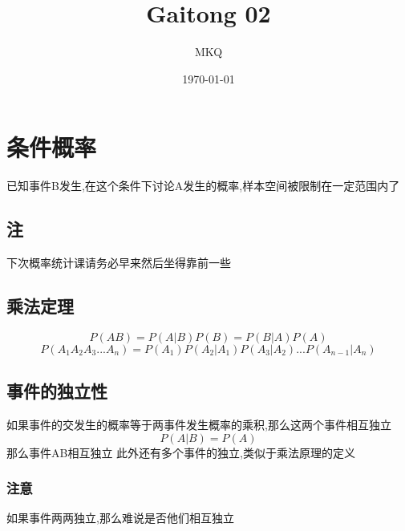 \documentclass[11pt]{article}
\author{MKQ}
\date{\today}
\title{Gaitong 02}
\begin{document}
\maketitle
\tableofcontents

\section{条件概率}
\label{sec:org6d7f063}
已知事件B发生,在这个条件下讨论A发生的概率,样本空间被限制在一定范围内了
\subsection{注}
\label{sec:org4fb7e56}
下次概率统计课请务必早来然后坐得靠前一些
\subsection{乘法定理}
\label{sec:orgee187d3}
\[
P(AB)=P(A|B)P(B)=P(B|A)P(A)
\]
\[
P(A_1 A_2 A_3 ... A_n )=P(A_1 )P(A_2 |A_1 )P(A_3 | A_2 )...P(A_{n-1}|A_n )
\]
\subsection{事件的独立性}
\label{sec:org29c5567}
如果事件的交发生的概率等于两事件发生概率的乘积,那么这两个事件相互独立
\[
P(A|B)=P(A)
\]
那么事件AB相互独立
此外还有多个事件的独立,类似于乘法原理的定义
\subsubsection{注意}
\label{sec:org582d6c3}
如果事件两两独立,那么难说是否他们相互独立
\end{document}
